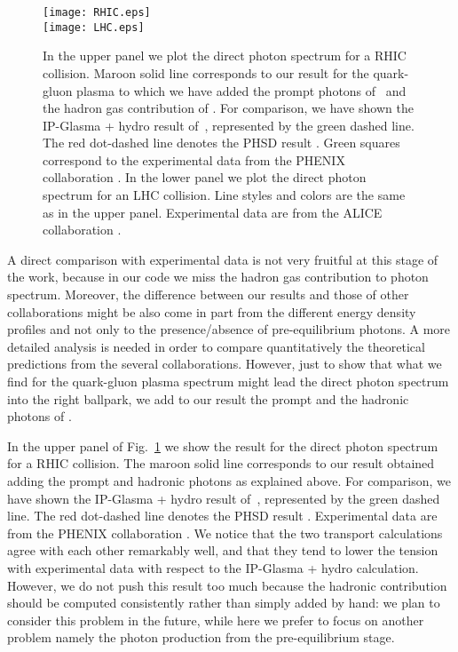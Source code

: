\documentclass[aps,prc,a4paper,nofootinbib,
preprintnumbers,superscriptaddress,twocolumn,showpacs,showkeys]{revtex4}
\begin{document}
\begin{figure}[t!]
\begin{center}
\texttt{[image: RHIC.eps]}\\
\texttt{[image: LHC.eps]}
\end{center}
\caption{\label{Fig:rhic_all}In the upper panel we plot the direct photon spectrum for a RHIC collision.
Maroon solid line corresponds to our result for the quark-gluon plasma to which
we have added the prompt photons of~\cite{paquet2016} and the hadron gas
contribution of \cite{Linnyk:2015tha}.
For comparison, we have shown the IP-Glasma + hydro result
of~\cite{paquet2016}, represented by the green dashed line.
The red dot-dashed line denotes the PHSD result \cite{Linnyk:2015tha}.
Green squares correspond to the experimental data from the PHENIX collaboration \cite{Adare:2014fwh}.
In the lower panel we plot the direct photon spectrum for an LHC collision.
Line styles and colors are the same as in the upper panel. Experimental data
are from the ALICE collaboration \cite{Adam:2015lda}.}
\end{figure}

A direct comparison with experimental data is not very fruitful at this stage of the work,
because in our code we miss the hadron gas contribution to photon spectrum.
Moreover, the difference between our results and those of other collaborations might be also come in part from the different energy density profiles and not only to the presence/absence of pre-equilibrium photons. A more detailed analysis is needed in order to compare quantitatively the theoretical predictions from the several collaborations. 
However, just to show that what we find for the quark-gluon plasma spectrum might lead the direct photon spectrum into the right ballpark, we add to our result
the prompt and the hadronic photons of  \cite{Linnyk:2015tha}.

In the upper panel of Fig.~\ref{Fig:rhic_all} we show the result for the direct photon spectrum for a RHIC collision.
The maroon solid line corresponds to our result obtained adding the prompt and hadronic photons
as explained above.
For comparison, we have shown the IP-Glasma + hydro result
of~\cite{paquet2016}, represented by the green dashed line.
The red dot-dashed line denotes the PHSD result \cite{Linnyk:2015tha}.
Experimental data are from the PHENIX collaboration \cite{Adare:2014fwh}.
We notice that the two transport calculations agree with each other remarkably
well, and that they tend to lower the tension with experimental data
with respect to the IP-Glasma + hydro calculation.
However, we do not push this result too much because
the hadronic contribution should be computed consistently rather than simply
added by hand: we plan to consider this problem in the future, while here we prefer
to focus on another problem namely the photon production from the pre-equilibrium stage. 
\end{document}
